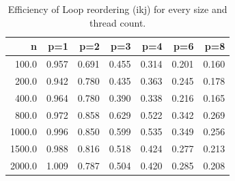 \begin{table}[ht]
\centering
\small
\begin{tabular}{rrrrrrr}
\hline
n & p=1 & p=2 & p=3 & p=4 & p=6 & p=8 \\
\hline
100.0 & 0.957 & 0.691 & 0.455 & 0.314 & 0.201 & 0.160 \\
200.0 & 0.942 & 0.780 & 0.435 & 0.363 & 0.245 & 0.178 \\
400.0 & 0.964 & 0.780 & 0.390 & 0.338 & 0.216 & 0.165 \\
800.0 & 0.972 & 0.858 & 0.629 & 0.522 & 0.342 & 0.269 \\
1000.0 & 0.996 & 0.850 & 0.599 & 0.535 & 0.349 & 0.256 \\
1500.0 & 0.988 & 0.816 & 0.518 & 0.424 & 0.277 & 0.213 \\
2000.0 & 1.009 & 0.787 & 0.504 & 0.420 & 0.285 & 0.208 \\
\hline
\end{tabular}
\caption{Efficiency of Loop reordering (ikj) for every size and thread count.}
\label{tab:efficiency_all_sizes_ikj}
\end{table}

